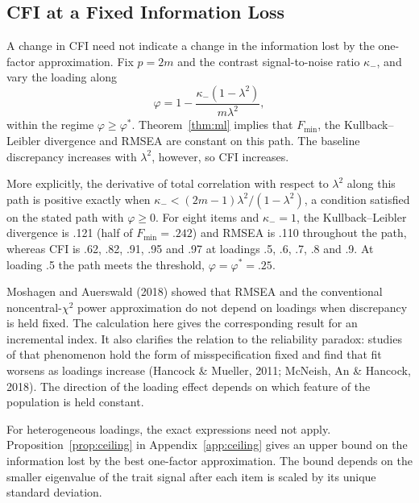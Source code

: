 \subsection{CFI at a Fixed Information Loss}

A change in CFI need not indicate a change in the information lost by the one-factor approximation. Fix $p=2m$ and the contrast signal-to-noise ratio $\kappa_-$, and vary the loading along
\[
\varphi=1-\frac{\kappa_-(1-\lambda^2)}{m\lambda^2},
\]
within the regime $\varphi\ge\varphi^*$. Theorem~\ref{thm:ml} implies that $F_{\min}$, the Kullback--Leibler divergence and RMSEA are constant on this path. The baseline discrepancy increases with $\lambda^2$, however, so CFI increases.

More explicitly, the derivative of total correlation with respect to $\lambda^2$ along this path is positive exactly when
$\kappa_-<(2m-1)\lambda^2/(1-\lambda^2)$, a condition satisfied on the stated path with $\varphi\ge0$. For eight items and $\kappa_-=1$, the Kullback--Leibler divergence is .121 (half of $F_{\min}=.242$) and RMSEA is .110 throughout the path, whereas CFI is .62, .82, .91, .95 and .97 at loadings .5, .6, .7, .8 and .9. At loading .5 the path meets the threshold, $\varphi=\varphi^*=.25$.

Moshagen and Auerswald (2018) showed that RMSEA and the conventional noncentral-$\chi^2$ power approximation do not depend on loadings when discrepancy is held fixed. The calculation here gives the corresponding result for an incremental index. It also clarifies the relation to the reliability paradox: studies of that phenomenon hold the form of misspecification fixed and find that fit worsens as loadings increase (Hancock \& Mueller, 2011; McNeish, An \& Hancock, 2018). The direction of the loading effect depends on which feature of the population is held constant.

For heterogeneous loadings, the exact expressions need not apply. Proposition~\ref{prop:ceiling} in Appendix~\ref{app:ceiling} gives an upper bound on the information lost by the best one-factor approximation. The bound depends on the smaller eigenvalue of the trait signal after each item is scaled by its unique standard deviation.
